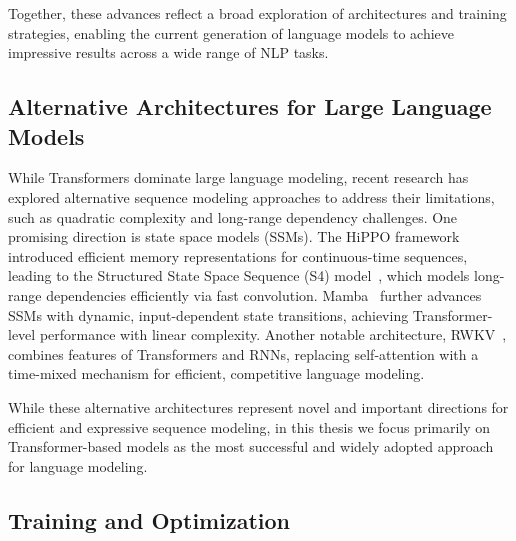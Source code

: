 Together, these advances reflect a broad exploration of architectures and training strategies, enabling the current generation of language models to achieve impressive results across a wide range of NLP tasks.

\subsection{Alternative Architectures for Large Language Models}
While Transformers dominate large language modeling, recent research has explored alternative sequence modeling approaches to address their limitations, such as quadratic complexity and long-range dependency challenges. One promising direction is state space models (SSMs). The HiPPO framework~\citep{gu2020hippo} introduced efficient memory representations for continuous-time sequences, leading to the Structured State Space Sequence (S4) model~\citep{gu2021efficiently}, which models long-range dependencies efficiently via fast convolution. Mamba~\citep{gu2023mamba} further advances SSMs with dynamic, input-dependent state transitions, achieving Transformer-level performance with linear complexity. Another notable architecture, RWKV~\citep{peng2023rwkv}, combines features of Transformers and RNNs, replacing self-attention with a time-mixed mechanism for efficient, competitive language modeling. 

While these alternative architectures represent novel and important directions for efficient and expressive sequence modeling, in this thesis we focus primarily on Transformer-based models as the most successful and widely adopted approach for language modeling.

\subsection{Training and Optimization}


